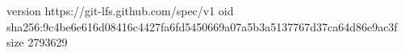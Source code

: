 version https://git-lfs.github.com/spec/v1
oid sha256:9c4be6e616d08416c4427fa6fd5450669a07a5b3a5137767d37ca64d86e9ac3f
size 2793629
